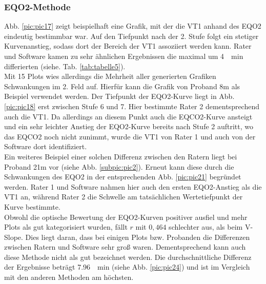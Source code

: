 \subsubsection{\gls{EQO2}-Methode}
%
Abb. \ref{pic:pic17} zeigt beispielhaft eine Grafik, mit der die VT1 anhand des \gls{EQO2} eindeutig bestimmbar war. Auf den Tiefpunkt nach der 2. Stufe folgt ein stetiger Kurvenanstieg, sodass dort der Bereich der VT1 assoziiert werden kann. Rater und Software kamen zu sehr ähnlichen Ergebnissen die maximal um \SI{4}{\per\minute} differierten (siehe. Tab. \ref{tab:tabelle5}).\\
Mit 15 Plots wies allerdings die Mehrheit aller generierten Grafiken Schwankungen im 2. Feld auf. Hierfür kann die Grafik von Proband 8m als Beispiel verwendet werden. Der Tiefpunkt der \gls{EQO2}-Kurve liegt in Abb. \ref{pic:pic18} erst zwischen Stufe 6 und 7. Hier bestimmte Rater 2 dementsprechend auch die VT1. Da allerdings an diesem Punkt auch die \gls{EQCO2}-Kurve ansteigt und ein sehr leichter Anstieg der \gls{EQO2}-Kurve bereits nach Stufe 2 auftritt, wo das \gls{EQCO2} noch nicht zunimmt, wurde die VT1 von Rater 1 und auch von der Software dort identifiziert.\\
Ein weiteres Beispiel einer solchen Differenz zwischen den Ratern liegt bei Proband 21m vor (siehe Abb. \ref{subpic:pic2}). Erneut kann diese durch die Schwankungen des \gls{EQO2} in der entsprechenden Abb. \ref{pic:pic21} begründet werden. Rater 1 und Software nahmen hier auch den ersten \gls{EQO2}-Anstieg als die VT1 an, während Rater 2 die Schwelle am tatsächlichen Wertetiefpunkt der Kurve bestimmte.\\
Obwohl die optische Bewertung der \gls{EQO2}-Kurven positiver ausfiel und mehr Plots als gut kategorisiert wurden, fällt $r$ mit $0,464$ schlechter aus, als beim V-Slope. Dies liegt daran, dass bei einigen Plots bzw. Probanden die Differenzen zwischen Ratern und Software sehr groß waren. Dementsprechend kann auch diese Methode nicht als gut bezeichnet werden. Die durchschnittliche Differenz der Ergebnisse beträgt \SI{7,96}{\per\minute} (siehe Abb. \ref{pic:pic24}) und ist im Vergleich mit den anderen Methoden am höchsten.
%
